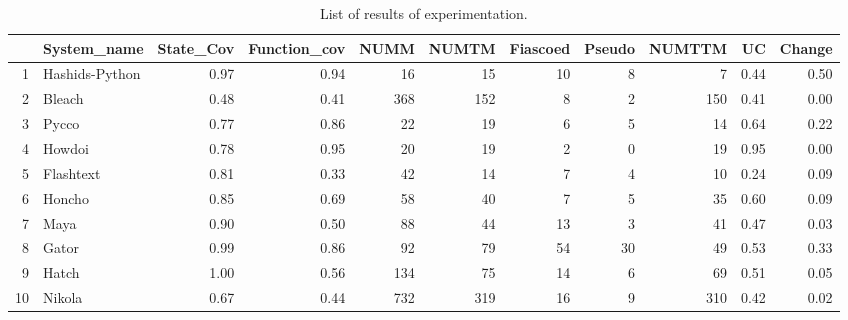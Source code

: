 \begin{table}[H]
\centering
\begingroup\tiny
\begin{tabular}{rlrrrrrrrrr}
  \hline
 & System\_name & State\_Cov & Function\_cov & NUMM & NUMTM & Fiascoed & Pseudo & NUMTTM & UC & Change \\
  \hline
1 & Hashids-Python & 0.97 & 0.94 &  16 &  15 &  10 &   8 &   7 & 0.44 & 0.50 \\
  2 & Bleach & 0.48 & 0.41 & 368 & 152 &   8 &   2 & 150 & 0.41 & 0.00 \\
  3 & Pycco & 0.77 & 0.86 &  22 &  19 &   6 &   5 &  14 & 0.64 & 0.22 \\
  4 & Howdoi & 0.78 & 0.95 &  20 &  19 &   2 &   0 &  19 & 0.95 & 0.00 \\
  5 & Flashtext & 0.81 & 0.33 &  42 &  14 &   7 &   4 &  10 & 0.24 & 0.09 \\
  6 & Honcho & 0.85 & 0.69 &  58 &  40 &   7 &   5 &  35 & 0.60 & 0.09 \\
  7 & Maya & 0.90 & 0.50 &  88 &  44 &  13 &   3 &  41 & 0.47 & 0.03 \\
  8 & Gator & 0.99 & 0.86 &  92 &  79 &  54 &  30 &  49 & 0.53 & 0.33 \\
  9 & Hatch & 1.00 & 0.56 & 134 &  75 &  14 &   6 &  69 & 0.51 & 0.05 \\
  10 & Nikola & 0.67 & 0.44 & 732 & 319 &  16 &   9 & 310 & 0.42 & 0.02 \\
   \hline
\end{tabular}
\endgroup
\caption{List of results of experimentation.}~\label{fullResult}
\end{table}
